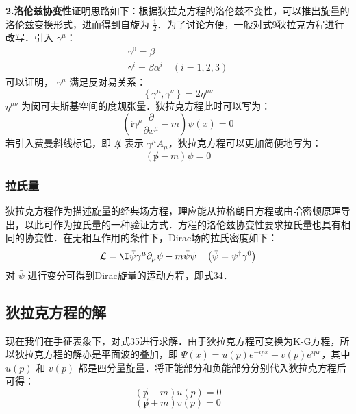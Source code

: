 \textbf{2.洛伦兹协变性}证明思路如下：根据狄拉克方程的洛伦兹不变性，可以推出旋量的洛伦兹变换形式，进而得到自旋为 $\frac{1}{2}$．为了讨论方便，一般对式9狄拉克方程进行改写．引入 $\gamma^{\mu}$：
\begin{equation}
\begin{array}{l}
\gamma^{0}=\beta \\
\gamma^{i}=\beta \alpha^{i} \quad(i=1,2,3)
\end{array}
\end{equation}
可以证明， $\gamma^{\mu}$ 满足反对易关系：
\begin{equation}
\left\{\gamma^{\mu}, \gamma^{\nu}\right\}=2 \eta^{\mu \nu}
\end{equation}
$\eta^{\mu \nu}$ 为闵可夫斯基空间的度规张量．狄拉克方程此时可以写为：
\begin{equation}\label{qed4_eq22}
\left(\mathrm{i} \gamma^{\mu} \frac{\partial}{\partial x^{\mu}}-m\right) \psi(x)=0
\end{equation}
若引入费曼斜线标记，即 $\not A$ 表示 $\gamma^{\mu}A_{\mu}$，狄拉克方程可以更加简便地写为：
\begin{equation}\label{qed4_eq21}
( \not p-m) \psi=0
\end{equation}
\subsubsection{拉氏量}
狄拉克方程作为描述旋量的经典场方程，理应能从拉格朗日方程或由哈密顿原理导出，以此可作为拉氏量的一种验证方式．方程的洛伦兹协变性要求拉氏量也具有相同的协变性．在无相互作用的条件下，Dirac场的拉氏密度如下：
\begin{equation}\label{qed4_eq20}
\mathcal{L}=\mathrm{\I} \bar{\psi} \gamma^{\mu} \partial_{\mu} \psi-m \bar{\psi} \psi \quad\left(\bar{\psi}=\psi^{\dagger} \gamma^{0}\right)
\end{equation}
对 $\bar\psi$ 进行变分可得到Dirac旋量的运动方程，即式34．

\subsection{狄拉克方程的解}
现在我们在手征表象下，对式35进行求解．由于狄拉克方程可变换为K-G方程，所以狄拉克方程的解亦是平面波的叠加，即 $\Psi(x)=u(p)e^{-ipx}+v(p)e^{ipx}$，其中 $u(p)$ 和 $v(p)$ 都是四分量旋量．将正能部分和负能部分分别代入狄拉克方程后可得：
\begin{equation}\label{qed4_eq23}
(\not p-m) u(p)=0 
\end{equation}
\begin{equation}
(\not p+m) v(p)=0
\end{equation}

